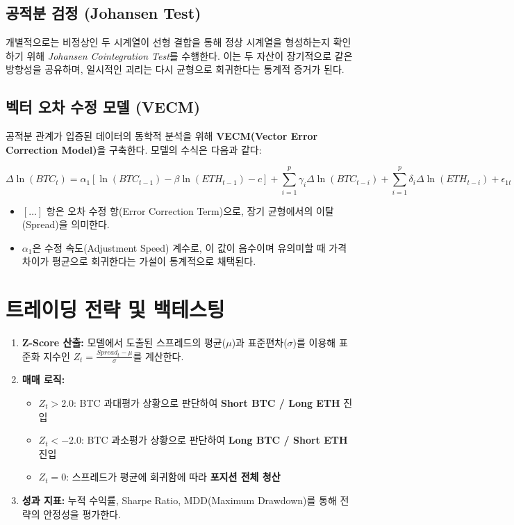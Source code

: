 \documentclass[11pt, a4paper]{article}
\begin{document}
	\subsection{공적분 검정 (Johansen Test)}
	개별적으로는 비정상인 두 시계열이 선형 결합을 통해 정상 시계열을 형성하는지 확인하기 위해 \textit{Johansen Cointegration Test}를 수행한다. 이는 두 자산이 장기적으로 같은 방향성을 공유하며, 일시적인 괴리는 다시 균형으로 회귀한다는 통계적 증거가 된다.
	
	\subsection{벡터 오차 수정 모델 (VECM)}
	공적분 관계가 입증된 데이터의 동학적 분석을 위해 \textbf{VECM(Vector Error Correction Model)}을 구축한다. 모델의 수식은 다음과 같다:
	
	\begin{equation}
		\Delta \ln(BTC_t) = \alpha_1 [\ln(BTC_{t-1}) - \beta \ln(ETH_{t-1}) - c] + \sum_{i=1}^{p} \gamma_i \Delta \ln(BTC_{t-i}) + \sum_{i=1}^{p} \delta_i \Delta \ln(ETH_{t-i}) + \epsilon_{1t}
	\end{equation}
	
	\begin{itemize}
		\item $[\dots]$ 항은 오차 수정 항(Error Correction Term)으로, 장기 균형에서의 이탈(Spread)을 의미한다.
		\item $\alpha_1$은 수정 속도(Adjustment Speed) 계수로, 이 값이 음수이며 유의미할 때 가격 차이가 평균으로 회귀한다는 가설이 통계적으로 채택된다.
	\end{itemize}
	
	\section{트레이딩 전략 및 백테스팅}
	\begin{enumerate}
		\item \textbf{Z-Score 산출:} 모델에서 도출된 스프레드의 평균($\mu$)과 표준편차($\sigma$)를 이용해 표준화 지수인 $Z_t = \frac{Spread_t - \mu}{\sigma}$를 계산한다.
		\item \textbf{매매 로직:} 
		\begin{itemize}
			\item $Z_t > 2.0$: BTC 과대평가 상황으로 판단하여 \textbf{Short BTC / Long ETH} 진입
			\item $Z_t < -2.0$: BTC 과소평가 상황으로 판단하여 \textbf{Long BTC / Short ETH} 진입
			\item $Z_t = 0$: 스프레드가 평균에 회귀함에 따라 \textbf{포지션 전체 청산}
		\end{itemize}
		\item \textbf{성과 지표:} 누적 수익률, Sharpe Ratio, MDD(Maximum Drawdown)를 통해 전략의 안정성을 평가한다.
	\end{enumerate}
	
\end{document}
